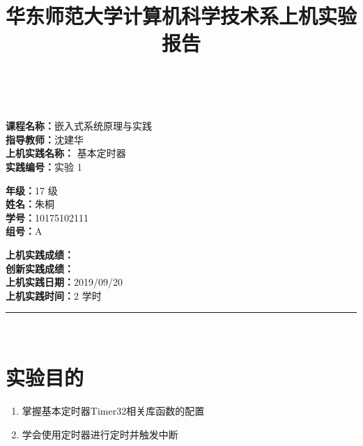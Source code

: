 \documentclass[a4paper,10pt,UTF8]{paper}
\title{华东师范大学计算机科学技术系上机实验报告}
\numberwithin{equation}{section}
\numberwithin{figure}{section}
\begin{document}
\pagestyle{fancy}
\lhead{}
\rhead{}
\makeatletter
\def\headrule{{\if@fancyplain\let\headrulewidth\plainheadrulewidth\fi%
    \color{gray}\hrule\@height 0.2pt\@width\headwidth}
    \vspace{6mm}}
\makeatother

\newcommand{\HRule}{\rule{\linewidth}{1mm}}
\newcommand{\dai}{\textbf{Dais-CMX16$^+$}}

{ \\ [0.8cm]
    
    \small{
        \begin{minipage}[t]{.32\linewidth}
            \textbf{课程名称：}嵌入式系统原理与实践\\
            \textbf{指导教师：}沈建华\\
            \textbf{上机实践名称：} 基本定时器\\
            \textbf{实践编号：}实验 1
        \end{minipage}
        \begin{minipage}[t]{.32\linewidth}
            \textbf{年级：}17 级\\
            \textbf{姓名：}朱桐\\
            \textbf{学号：}10175102111\\
            \textbf{组号：}A
        \end{minipage} 
        \begin{minipage}[t]{.32\linewidth}
            \textbf{上机实践成绩：} \\
            \textbf{创新实践成绩：} \\
            \textbf{上机实践日期：}2019/09/20\\
            \textbf{上机实践时间：}2 学时\\
        \end{minipage}
    }
    \HRule \\[0.5cm]
}


\section{实验目的}

\begin{enumerate}
    \item 掌握基本定时器Timer32相关库函数的配置
    \item 学会使用定时器进行定时并触发中断
\end{enumerate}
\end{document}
